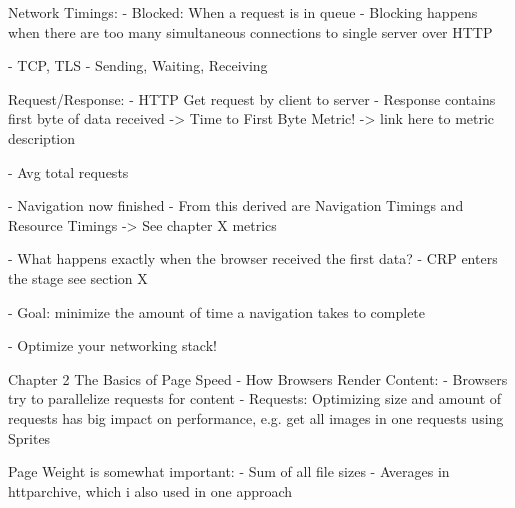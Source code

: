 Network Timings:
- Blocked: When a request is in queue
- Blocking happens when there are too many simultaneous connections to single server over HTTP

- TCP, TLS
- Sending, Waiting, Receiving







Request/Response:
- HTTP Get request by client to server
- Response contains first byte of data received -> Time to First Byte Metric! -> link here to metric description


- Avg total requests %






- Navigation now finished
- From this derived are Navigation Timings and Resource Timings -> See chapter X metrics 

- What happens exactly when the browser received the first data?
- CRP enters the stage see section X



- Goal: minimize the amount of time a navigation takes to complete


- Optimize your networking stack!



Chapter 2 The Basics of Page Speed - How Browsers Render Content:
- Browsers try to parallelize requests for content
- Requests: Optimizing size and amount of requests has big impact on performance, e.g. get all images in one requests using Sprites

Page Weight is somewhat important:
- Sum of all file sizes
- Averages in httparchive, which i also used in one approach %

